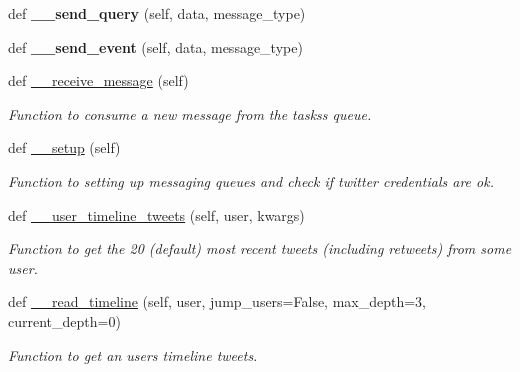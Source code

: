 \begin{DoxyCompactItemize}
def {\bfseries \+\_\+\+\_\+send\+\_\+query} (self, data, message\+\_\+type)
\item 
\mbox{\label{classtwitter_1_1bots_1_1twitter__bot_1_1TwitterBot_adc08d647ee9c4f616e1e0e6ee4b8b210}} 
def {\bfseries \+\_\+\+\_\+send\+\_\+event} (self, data, message\+\_\+type)
\item 
\mbox{\label{classtwitter_1_1bots_1_1twitter__bot_1_1TwitterBot_ab01f79e666e2800245e549a6ab1c6092}} 
def \hyperlink{classtwitter_1_1bots_1_1twitter__bot_1_1TwitterBot_ab01f79e666e2800245e549a6ab1c6092}{\+\_\+\+\_\+receive\+\_\+message} (self)
\begin{DoxyCompactList}\small\item\em Function to consume a new message from the tasks\textquotesingle{}s queue. \end{DoxyCompactList}\item 
\mbox{\label{classtwitter_1_1bots_1_1twitter__bot_1_1TwitterBot_a5a18ff7f694fa980f68e2ab32f7de0bd}} 
def \hyperlink{classtwitter_1_1bots_1_1twitter__bot_1_1TwitterBot_a5a18ff7f694fa980f68e2ab32f7de0bd}{\+\_\+\+\_\+setup} (self)
\begin{DoxyCompactList}\small\item\em Function to setting up messaging queues and check if twitter credentials are ok. \end{DoxyCompactList}\item 
def \hyperlink{classtwitter_1_1bots_1_1twitter__bot_1_1TwitterBot_a5a866341dca3ec8b2180cb8b838c32a6}{\+\_\+\+\_\+user\+\_\+timeline\+\_\+tweets} (self, user, kwargs)
\begin{DoxyCompactList}\small\item\em Function to get the 20 (default) most recent tweets (including retweets) from some user. \end{DoxyCompactList}\item 
def \hyperlink{classtwitter_1_1bots_1_1twitter__bot_1_1TwitterBot_a1a5f8d543b81a42834e249e7d169521c}{\+\_\+\+\_\+read\+\_\+timeline} (self, user, jump\+\_\+users=False, max\+\_\+depth=3, current\+\_\+depth=0)
\begin{DoxyCompactList}\small\item\em Function to get an user\textquotesingle{}s timeline tweets. \end{DoxyCompactList}\item 

\end{DoxyCompactItemize}
